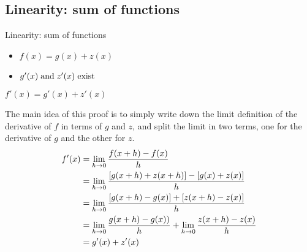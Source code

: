 \subsection{Linearity: sum of functions}

\begin{property}{Linearity: sum of functions}
\begin{precondition}
    \begin{itemize}
      \item $f(x)=g(x)+z(x)$
      \item $g'(x) \; \text{and} \; z'(x) \; \text{exist} \;$
    \end{itemize}
  \end{precondition}
\begin{claim}
    $f'(x)=g'(x)+z'(x)$
\end{claim}
\begin{Proof}
  The main idea of this proof is to simply write down the limit definition of the derivative of $f$ in terms of $g$ and $z$, and split the limit in two terms, one for the derivative of $g$ and the other for $z$.
  \begin{align*}
  f'(x)&=\lim\limits_{h \rightarrow 0}  \frac{f(x+h)-f(x)}{h}
  \\&= \lim\limits_{h \rightarrow 0}  \frac{ [ g(x+h) + z(x+h) ] - [g(x)+z(x)]}{h}
  \\&=\lim\limits_{h \rightarrow 0}  \frac{ [g(x+h) - g(x)] + [z(x+h) - z(x)]}{h}
  \\&= \lim\limits_{h \rightarrow 0}  \frac{ g(x+h) - g(x))}{h} + \lim\limits_{h \rightarrow 0}  \frac{ z(x+h) - z(x)}{h}
  \\&= g'(x) + z'(x)
  \end{align*}
\end{Proof}
\end{property}


